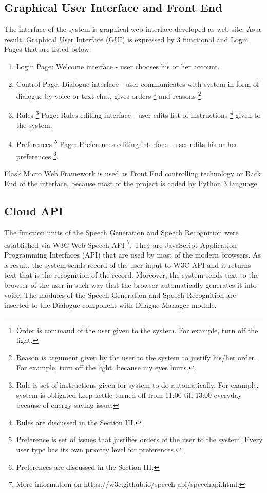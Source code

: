\documentclass{llncs}
\begin{document}
    \subsection{Graphical User Interface and Front End}
    The interface of the system is graphical web interface developed as web site.
    As a result, Graphical User Interface (GUI) is expressed by 3 functional and Login Pages that are listed below:
    \begin{enumerate}
        \item Login Page: Welcome interface - user chooses his or her account.
        \item Control Page: Dialogue interface - user communicates with system in form of dialogue by voice or text chat,
        gives orders \footnote{Order is command of the user given to the system. For example, turn off the light.} and reasons \footnote{Reason is argument given by the user to the system to justify his/her order. For example, turn off the light, because my eyes hurts.}.
        \item Rules \footnote{Rule is set of instructions given for system to do automatically. For example, system is obligated keep kettle turned off from 11:00 till 13:00 everyday because of energy saving issue.}
        Page: Rules editing interface - user edits list of instructions \footnote{Rules are discussed in the Section III.} given to the system.
        \item Preferences \footnote{Preference is set of issues that justifies orders of the user to the system. Every user type has its own priority level for preferences.} Page: Preferences editing interface - user edits his or her preferences \footnote{Preferences are discussed in the Section III.}.
    \end{enumerate}
    Flask Micro Web Framework is used as Front End controlling technology or Back End of the interface, because most of the project is coded by Python 3 language.
    \subsection{Cloud API}
    The function units of the Speech Generation and Speech Recognition were established via W3C Web Speech API \footnote{More information on https://w3c.github.io/speech-api/speechapi.html.}.
    They are JavaScript Application Programming Interfaces (API) that are used by most of the modern browsers.
    As a result, the system sends record of the user input to W3C API and it returns text that is the recognition of the record.
    Moreover, the system sends text to the browser of the user in such way that the browser automatically generates it into voice.
    The modules of the Speech Generation and Speech Recognition are inserted to the Dialogue component with Dilague Manager module.
\end{document}
